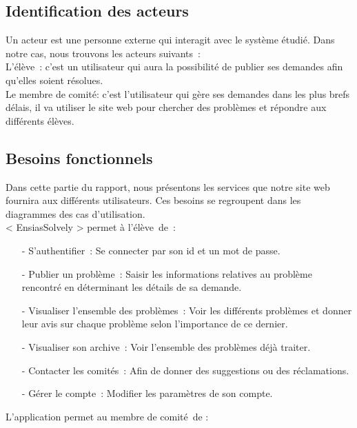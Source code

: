 \documentclass[11.5pt]{report}
\begin{document}
\subsection{Identification des acteurs }
Un acteur est une personne externe qui interagit avec le système étudié. Dans notre cas, nous trouvons les acteurs suivants :\\
L’élève : c’est un utilisateur qui aura la possibilité de publier ses demandes afin qu’elles soient résolues.\\
Le membre de comité: c’est l’utilisateur qui gère ses demandes dans les plus brefs délais, il va utiliser le site web pour chercher des problèmes et répondre aux différents élèves.\\

\subsection{Besoins fonctionnels }
Dans cette partie du rapport, nous présentons les services que notre site web fournira aux différents utilisateurs. Ces besoins se regroupent dans les diagrammes des cas d’utilisation. \\
< EnsiasSolvely > permet à l’élève de :\\
\begin{itemize}
	\item[-] S’authentifier : Se connecter par son id et un mot de passe.
	\item[-] Publier un problème : Saisir les informations relatives au problème rencontré en déterminant les détails de sa demande.
	\item[-] Visualiser l’ensemble des problèmes : Voir les différents problèmes et donner leur avis sur chaque problème selon l’importance de ce dernier.
	\item[-] Visualiser son archive : Voir l’ensemble des problèmes déjà traiter.
	\item[-] Contacter les comités : Afin de donner des suggestions ou des réclamations.
	\item[-] Gérer le compte : Modifier les paramètres de son compte.\\
	  
\end{itemize}
L’application permet au membre de comité de :\\
\end{document}
